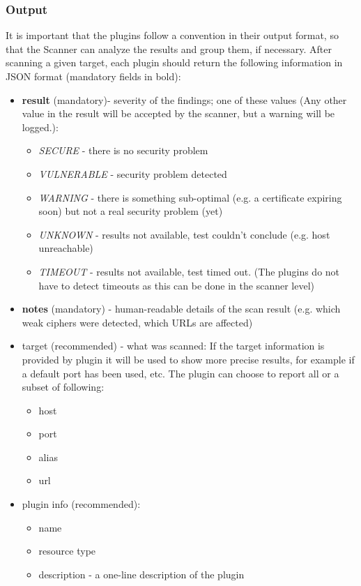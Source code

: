\subsubsection{Output}
It is important that the plugins follow a convention in their output format, so that the Scanner can analyze the results and group them, if necessary. After scanning a given target, each plugin should return the following information in JSON format (mandatory fields in bold): 
\begin{itemize}


   \item \textbf{result} (mandatory)- severity of the findings; one of these values (Any other value in the result will be accepted by the scanner, but a warning will be logged.):
    \begin{itemize}
    

        \item \textit{SECURE} - there is no security problem
        \item  \textit{VULNERABLE} - security problem detected
        \item  \textit{WARNING} - there is something sub-optimal (e.g. a certificate expiring soon) but not a real security problem (yet)
        \item  \textit{UNKNOWN} - results not available, test couldn't conclude (e.g. host unreachable)
        \item  \textit{TIMEOUT} - results not available, test timed out. (The plugins do not have to detect timeouts as this can be done in the scanner level) 
            \end{itemize}
\item      \textbf{notes} (mandatory) - human-readable details of the scan result (e.g. which weak ciphers were detected, which URLs are affected)
\item      target (recommended) - what was scanned: If the target information is provided by plugin it will be used to show more precise results, for example if a default port has been used, etc. The plugin can choose to report all or a subset of following:
\begin{itemize}


\item        host
\item    port
\item    alias
\item    url 
\end{itemize}
\item    plugin info (recommended):
\begin{itemize}
\item        name
\item    resource type
\item    description - a one-line description of the plugin 
\end{itemize}
\end{itemize}
